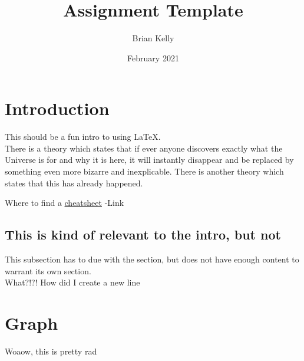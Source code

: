 \documentclass{article}
\title{Assignment Template}
\author{Brian Kelly}
\date{February 2021}
\begin{document}
\maketitle

\section{Introduction}
This should be a fun intro to using LaTeX.\\
There is a theory which states that if ever anyone discovers exactly what the Universe is for and why it is here, it will instantly disappear and be replaced by something even more bizarre and inexplicable.
There is another theory which states that this has already happened.

Where to find a \href{http://tug.ctan.org/info/latex-refsheet/LaTeX_RefSheet.pdf}{cheatsheet} \leq -Link

\subsection{This is kind of relevant to the intro, but not}
This subsection has to due with the section, but does not have enough content to warrant its own section.\\ What?!?! How did I create a new line

\section{Graph}
Woaow, this is pretty rad\\
\end{document}
